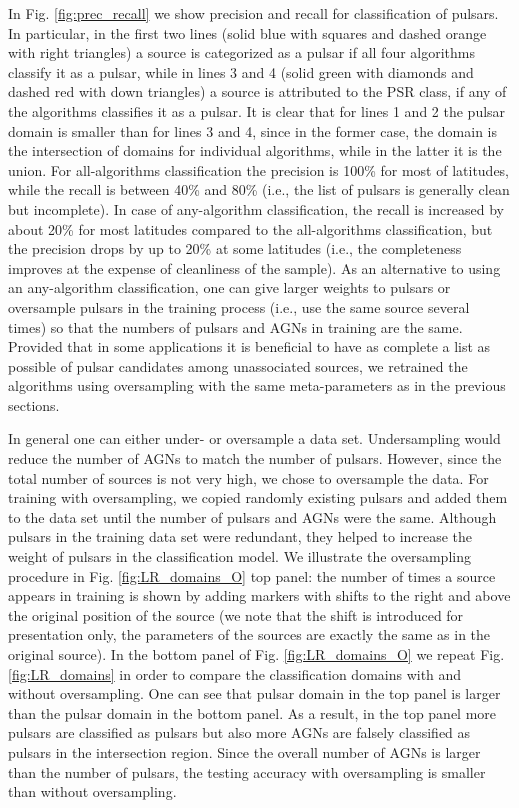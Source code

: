 \documentclass[referee]{aa} %
\begin{document}
In Fig. \ref{fig:prec_recall} we show precision and recall for classification of pulsars.
In particular, in the first two lines (solid blue with squares and dashed orange with right triangles) a source is categorized as a pulsar if all four algorithms classify it as a pulsar,
while in lines 3 and 4 (solid green with diamonds and dashed red with down triangles) a source is attributed to the PSR class, if any of the algorithms classifies it as a pulsar.
It is clear that for lines 1 and 2 the pulsar domain is smaller than for lines 3 and 4, since in the former case, the domain is the intersection of domains for individual algorithms, while in the latter it is the union.
For all-algorithms classification the precision is 100\% for most of latitudes, while the recall is between 40\% and 80\% (i.e., the list of pulsars is generally clean but incomplete).
In case of any-algorithm classification, the recall is increased by about 20\% for most latitudes compared to the all-algorithms classification, but the precision drops by up to 20\% at some latitudes (i.e., the completeness improves at the expense of cleanliness of the sample).
As an alternative to using an any-algorithm classification, one can give larger weights to pulsars or oversample pulsars in the training process (i.e., use the same source several times) so that the numbers of pulsars and AGNs in training are the same.
Provided that in some applications it is beneficial to have as complete a list as possible of pulsar candidates among unassociated sources, we retrained the algorithms using oversampling with the same meta-parameters as in the previous sections.

In general one can either under- or oversample a data set. Undersampling would reduce the number of AGNs to match the number of pulsars. However, since the total number of sources is not very high, we chose to oversample the data. 
For training with oversampling, we copied randomly existing pulsars and added them to the data set until the number of pulsars and AGNs were the same.
Although pulsars in the training data set were redundant, they helped to increase the weight of pulsars in the classification model.
We illustrate the oversampling procedure in Fig. \ref{fig:LR_domains_O} top panel:
the number of times a source appears in training is shown by adding markers with shifts to the right and above the original position of the source (we note that the shift is introduced for presentation only, the parameters of the sources are exactly the same as in the original source).
In the bottom panel of Fig. \ref{fig:LR_domains_O} we repeat Fig.  \ref{fig:LR_domains} in order to compare the classification domains with and without oversampling.
One can see that pulsar domain in the top panel is larger than the pulsar domain in the bottom panel.
As a result, in the top panel more pulsars are classified as pulsars but also more AGNs are falsely classified as pulsars in the intersection region. 
Since the overall number of AGNs is larger than the number of pulsars, the testing accuracy with oversampling is smaller than without oversampling.
\end{document}
